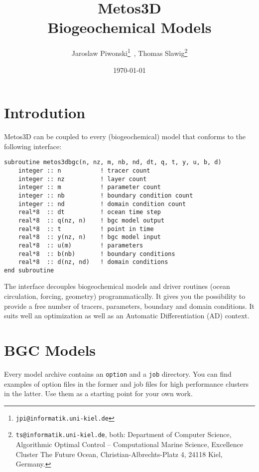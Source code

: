 \documentclass{article}
\begin{document}
%
%
\title{
Metos3D \\
\bigskip
Biogeochemical Models
}
\author{
Jaroslaw Piwonski\thanks{\texttt{jpi@informatik.uni-kiel.de}} \,,
Thomas Slawig\thanks{\texttt{ts@informatik.uni-kiel.de},
both: Department of Computer Science, Algorithmic Optimal Control -- Computational Marine Science,
Excellence Cluster The Future Ocean, Christian-Albrechts-Platz 4, 24118 Kiel, Germany.}
}
\date{\today}
\maketitle

%
%
\section{Introdution}

Metos3D can be coupled to every (biogeochemical) model that conforms to the following interface:

\begin{verbatim}
subroutine metos3dbgc(n, nz, m, nb, nd, dt, q, t, y, u, b, d)
    integer :: n           ! tracer count
    integer :: nz          ! layer count
    integer :: m           ! parameter count
    integer :: nb          ! boundary condition count
    integer :: nd          ! domain condition count
    real*8  :: dt          ! ocean time step
    real*8  :: q(nz, n)    ! bgc model output
    real*8  :: t           ! point in time
    real*8  :: y(nz, n)    ! bgc model input
    real*8  :: u(m)        ! parameters
    real*8  :: b(nb)       ! boundary conditions
    real*8  :: d(nz, nd)   ! domain conditions
end subroutine
\end{verbatim}

The interface decouples biogeochemical models and driver routines (ocean circulation, forcing, geometry) programmatically. It gives you the possibility to provide a free number of tracers, parameters, boundary and domain conditions. It suits well an optimization as well as an Automatic Differentiation (AD) context.

%
%
\section{BGC Models}

Every model archive contains an \texttt{option} and a \texttt{job}
directory. You can find examples of option files in the former
and job files for high performance clusters in the latter.
Use them as a starting point for your own work.
\end{document}
